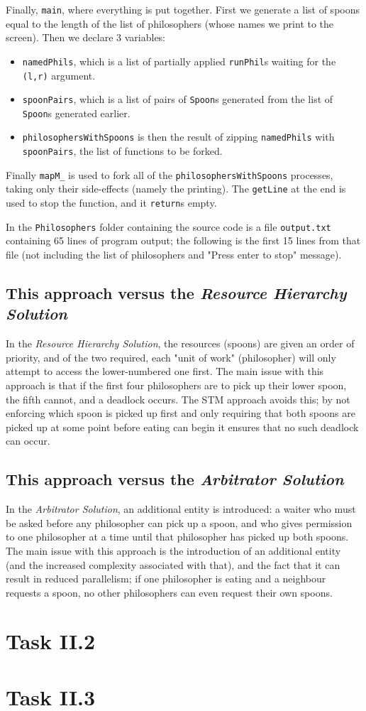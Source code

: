 \documentclass[12pt]{article}
\begin{document}
Finally, \verb|main|, where everything is put together.
First we generate a list of spoons equal to the length of the list of philosophers (whose names we print to the screen).
Then we declare 3 variables:
\begin{itemize}
  \item \verb|namedPhils|, which is a list of partially applied \verb|runPhil|s waiting for the \verb|(l,r)| argument.
  \item \verb|spoonPairs|, which is a list of pairs of \verb|Spoon|s generated from the list of \verb|Spoon|s generated earlier.
  \item \verb|philosophersWithSpoons| is then the result of zipping \verb|namedPhils| with \verb|spoonPairs|, the list of functions to be forked.
\end{itemize}

Finally \verb|mapM_| is used to fork all of the \verb|philosophersWithSpoons| processes, taking only their side-effects (namely the printing).
The \verb|getLine| at the end is used to stop the function, and it \verb|return|s empty.
\par
In the \verb|Philosophers| folder containing the source code is a file \verb|output.txt| containing 65 lines of program output; the following is the first 15 lines from that file (not including the list of philosophers and "Press enter to stop" message).



\subsection{This approach versus the \textit{Resource Hierarchy Solution}}
In the \textit{Resource Hierarchy Solution}, the resources (spoons) are given an order of priority, and  of the two required, each "unit of work" (philosopher) will only attempt to access the lower-numbered one first.
The main issue with this approach is that if the first four philosophers are to pick up their lower spoon, the fifth cannot, and a deadlock occurs.
The STM approach avoids this; by not enforcing which spoon is picked up first and only requiring that both spoons are picked up at some point before eating can begin it ensures that no such deadlock can occur.

\subsection{This approach versus the \textit{Arbitrator Solution}}
In the \textit{Arbitrator Solution}, an additional entity is introduced: a waiter who must be asked before any philosopher can pick up a spoon, and who gives permission to one philosopher at a time until that philosopher has picked up both spoons.
The main issue with this approach is the introduction of an additional entity (and the increased complexity associated with that), and the fact that it can result in reduced parallelism; if one philosopher is eating and a neighbour requests a spoon, no other philosophers can even request their own spoons.

\section{Task II.2}

\section{Task II.3}
\end{document}
